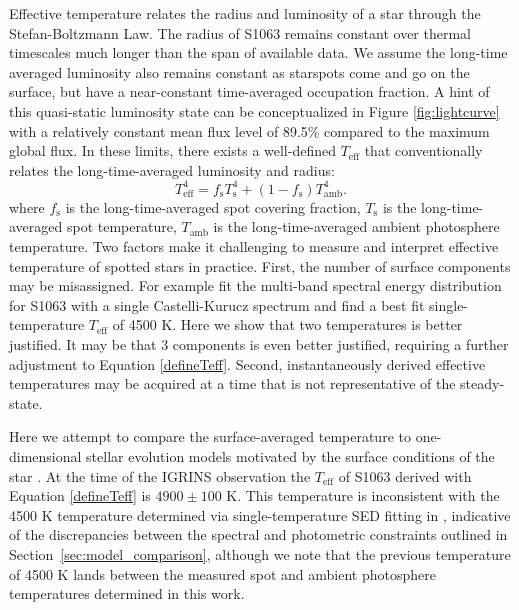 \documentclass[trackchanges]{aastex631}
\begin{document}
Effective temperature relates the radius and luminosity of a star through the Stefan-Boltzmann Law.  The radius of S1063 remains constant over thermal timescales much longer than the span of available data.  We assume the long-time averaged luminosity also remains constant as starspots come and go on the surface, but have a near-constant time-averaged occupation fraction.  A hint of this quasi-static luminosity state can be conceptualized in Figure \ref{fig:lightcurve} with a relatively constant mean flux level of 89.5\% compared to the maximum global flux.  In these limits, there exists a well-defined $T_{\textrm{eff}}$ that conventionally relates the long-time-averaged luminosity and radius:
\begin{equation}
T_{\textrm{eff}}^4 = f_{\textrm{s}} T_{\textrm{s}}^4 + (1 -f_{\textrm{s}}) T_{\textrm{amb}}^4 . \label{defineTeff}
\end{equation}
where $f_{\textrm{s}}$ is the long-time-averaged spot covering fraction, $T_{\textrm{s}}$ is the long-time-averaged spot temperature, $T_{\textrm{amb}}$ is the long-time-averaged ambient photosphere temperature.  Two factors make it challenging to measure and interpret effective temperature of spotted stars in practice. First, the number of surface components may be misassigned.  For example \citet{leiner17} fit the multi-band spectral energy distribution for S1063 with a single Castelli-Kurucz spectrum \citep{2003IAUS..210P.A20C} and find a best fit single-temperature $T_{\textrm{eff}}$ of 4500 K.  Here we show that two temperatures is better justified.  It may be that 3 components is even better justified, requiring a further adjustment to Equation \ref{defineTeff}.   Second, instantaneously derived effective temperatures may be acquired at a time that is not representative of the steady-state.

Here we attempt to compare the surface-averaged temperature to one-dimensional stellar evolution models motivated by the surface conditions of the star \citep{somers20}. At the time of the IGRINS observation the $T_{\textrm{eff}}$ of S1063 derived with Equation \ref{defineTeff} is $4900\pm100$ K. This temperature is inconsistent with the 4500 K temperature determined via single-temperature SED fitting in \citet{leiner17}, indicative of the discrepancies between the spectral and photometric constraints outlined in Section~\ref{sec:model_comparison}, although we note that the previous temperature of 4500 K lands between the measured spot and ambient photosphere temperatures determined in this work.
\end{document}
